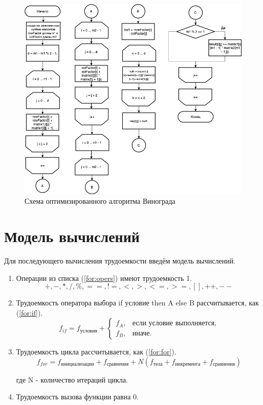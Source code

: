 \documentclass[12pt]{report}
\begin{document}
\begin{figure}[h!p]\label{vinOptScheme}
	\centering
	\includegraphics[scale = 0.65]{report_files/vinOpt.drawio.png}
	\caption{Схема оптимизированного алгоритма Винограда}
	\label{fig:grapesOpt}
\end{figure}


\section{Модель вычислений}

Для последующего вычисления трудоемкости введём модель вычислений.

\begin{enumerate}
	\item Операции из списка (\ref{for:opers}) имеют трудоемкость 1.
	\begin{equation}
	\label{for:opers}
	+, -, *, /, \%, ==, !=, <, >, <=, >=, [], ++, {-}-
	\end{equation}
	\item Трудоемкость оператора выбора if условие then A else B рассчитывается, как (\ref{for:if}).
	\begin{equation}
	\label{for:if}
	f_{if} = f_{\text{условия}} +
	\begin{cases}
	f_A, & \text{если условие выполняется,}\\
	f_B, & \text{иначе.}
	\end{cases}
	\end{equation}
	\item Трудоемкость цикла рассчитывается, как (\ref{for:for}).
	\begin{equation}
	\label{for:for}
	f_{for} = f_{\text{инициализации}} + f_{\text{сравнения}} + N(f_{\text{тела}} + f_{\text{инкремента}} + f_{\text{сравнения}})
	\end{equation}
	
	где N - количество итераций цикла.
	\item Трудоемкость вызова функции равна 0.
\end{enumerate}
\end{document}
